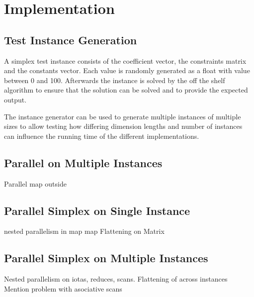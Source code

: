 \section{Implementation}
\subsection{Test Instance Generation}
A simplex test instance consists of the coefficient vector, the constraints matrix and the constants vector. Each value is randomly generated as a float with value between 0 and 100. Afterwards the instance is solved by the off the shelf algorithm to ensure that the solution can be solved and to provide the expected output. 

The instance generator can be used to generate multiple instances of multiple sizes to allow testing how differing dimension lengths and number of instances can influence the running time of the different implementations.

\subsection{Parallel on Multiple Instances}
Parallel map outside

\subsection{Parallel Simplex on Single Instance}
nested parallelism in map map
Flattening on Matrix

\subsection{Parallel Simplex on Multiple Instances}
Nested parallelism on iotas, reduces, scans.
Flattening of across instances
Mention problem with asociative scans
